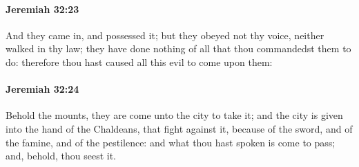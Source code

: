 		\paragraph{Jeremiah 32:23} %
			\label{JEREMIAH-32-23}

			And they came in, and possessed it; but they obeyed not thy voice, neither walked in thy law; they have done nothing of all that thou commandedst them to do: therefore thou hast caused all this evil to come upon them:


		\paragraph{Jeremiah 32:24} %
			\label{JEREMIAH-32-24}

			Behold the mounts, they are come unto the city to take it; and the city is given into the hand of the Chaldeans, that fight against it, because of the sword, and of the famine, and of the pestilence: and what thou hast spoken is come to pass; and, behold, thou seest it.

